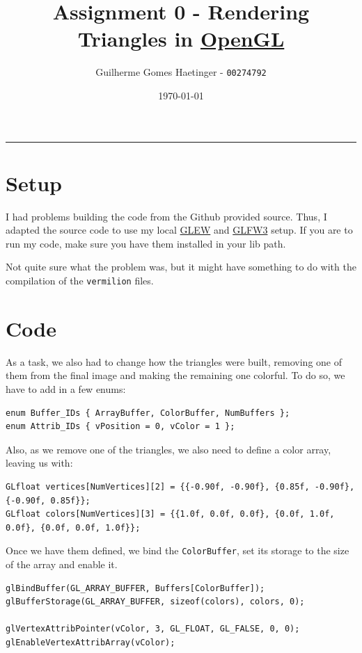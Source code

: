 \documentclass[11pt]{article}
\author{Guilherme Gomes Haetinger - \texttt{00274792}}
\date{\today}
\title{Assignment 0 - Rendering Triangles in \uline{OpenGL}}
\begin{document}
\maketitle

\noindent\rule{\textwidth}{0.5pt}

\section{Setup}
\label{sec:org651e0a6}

I had problems building the code from the Github provided source. Thus, I
adapted the source code to use my local \uline{GLEW} and \uline{GLFW3} setup. If you are to
run my code, make sure you have them installed in your lib path.

Not quite sure what the problem was, but it might have something to do with the
compilation of the \texttt{vermilion} files.

\section{Code}
\label{sec:org7d1dbd1}

As a task, we also had to change how the triangles were built, removing one of
them from the final image and making the remaining one colorful. To do so, we
have to add in a few enums:

\begin{verbatim}
enum Buffer_IDs { ArrayBuffer, ColorBuffer, NumBuffers };
enum Attrib_IDs { vPosition = 0, vColor = 1 };
\end{verbatim}

Also, as we remove one of the triangles, we also need to define a color array,
leaving us with:

\begin{verbatim}
GLfloat vertices[NumVertices][2] = {{-0.90f, -0.90f}, {0.85f, -0.90f}, {-0.90f, 0.85f}};
GLfloat colors[NumVertices][3] = {{1.0f, 0.0f, 0.0f}, {0.0f, 1.0f, 0.0f}, {0.0f, 0.0f, 1.0f}};
\end{verbatim}

Once we have them defined, we bind the \texttt{ColorBuffer}, set its storage to the
size of the array and enable it.

\begin{verbatim}
glBindBuffer(GL_ARRAY_BUFFER, Buffers[ColorBuffer]);
glBufferStorage(GL_ARRAY_BUFFER, sizeof(colors), colors, 0);

glVertexAttribPointer(vColor, 3, GL_FLOAT, GL_FALSE, 0, 0);
glEnableVertexAttribArray(vColor);
\end{verbatim}
\end{document}
